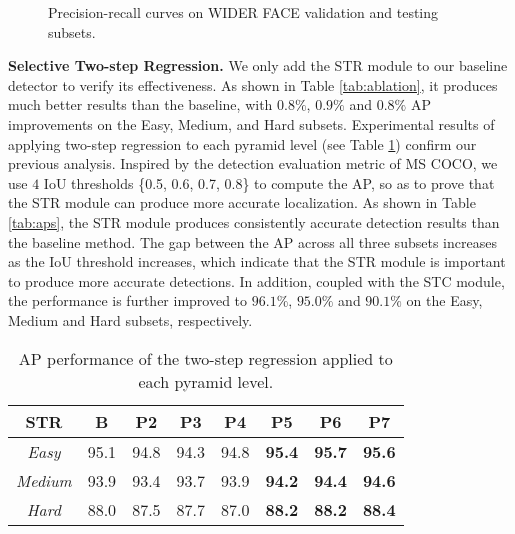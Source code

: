 \documentclass[letterpaper]{article} \usepackage{aaai19m}  \usepackage{times}  \usepackage{helvet}  \usepackage{courier}  \usepackage{url}  \usepackage{graphicx}  \usepackage{subfigure}
\begin{document}
\begin{figure*}[h]
\centering
{}
\caption{Precision-recall curves on WIDER FACE validation and testing subsets.}
\label{fig:wider-face-ap} \end{figure*}


{\flushleft \textbf{Selective Two-step Regression.} }
We only add the STR module to our baseline detector to verify its effectiveness. As shown in Table \ref{tab:ablation}, it produces much better results than the baseline, with $0.8\%$, $0.9\%$ and $0.8\%$ AP improvements on the Easy, Medium, and Hard subsets. Experimental results of applying two-step regression to each pyramid level (see Table \ref{tab:str_per_level}) confirm our previous analysis. Inspired by the detection evaluation metric of MS COCO, we use $4$ IoU thresholds \{0.5, 0.6, 0.7, 0.8\} to compute the AP, so as to prove that the STR module can produce more accurate localization. As shown in Table \ref{tab:aps}, the STR module produces consistently accurate detection results than the baseline method. The gap between the AP across all three subsets increases as the IoU threshold increases, which indicate that the STR module is important to produce more accurate detections. In addition, coupled with the STC module, the performance is further improved to $96.1\%$, $95.0\%$ and $90.1\%$ on the Easy, Medium and Hard subsets, respectively.

\vspace{-1.5mm}
\begin{table}[h]
\centering
\setlength{\tabcolsep}{3pt}
\caption{AP performance of the two-step regression applied to each pyramid level.}
\setlength{\tabcolsep}{5.2pt}
\begin{tabular}{c|c|cccccc}
\toprule[1.5pt]
STR & B & P2 & P3 & P4 & P5 & P6 & P7 \\
\hline
{\em Easy} & 95.1 & 94.8 & 94.3 & 94.8 & \bf 95.4 & \bf 95.7 & \bf 95.6 \\
{\em Medium} & 93.9 & 93.4 & 93.7 & 93.9 & \bf 94.2 & \bf 94.4 & \bf 94.6  \\
{\em Hard} & 88.0 & 87.5 & 87.7 & 87.0 & \bf 88.2 & \bf 88.2 & \bf 88.4 \\
\bottomrule[1.5pt]
\end{tabular}
\vspace{-5mm}
\label{tab:str_per_level}
\end{table}
\end{document}
